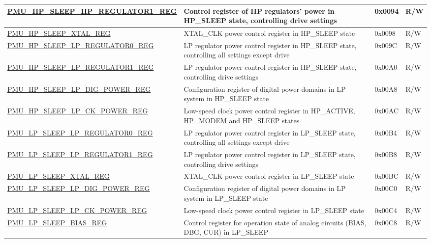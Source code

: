 \begin{longtable}{ | l | p{6cm} | p{1.3cm} | p{1.5cm} | }
\hyperref[regdesc:PMUHPSLEEPHPREGULATOR1REG]{PMU\_HP\_SLEEP\_HP\_REGULATOR1\_REG} & Control register of HP regulators' power in HP\_SLEEP state, controlling drive settings & 0x0094 & R/W \\ \hline
\hyperref[regdesc:PMUHPSLEEPXTALREG]{PMU\_HP\_SLEEP\_XTAL\_REG} & XTAL\_CLK power control register in HP\_SLEEP state & 0x0098 & R/W \\ \hline
\hyperref[regdesc:PMUHPSLEEPLPREGULATOR0REG]{PMU\_HP\_SLEEP\_LP\_REGULATOR0\_REG} & LP regulator power control register in HP\_SLEEP state, controlling all settings except drive & 0x009C & R/W \\ \hline
\hyperref[regdesc:PMUHPSLEEPLPREGULATOR1REG]{PMU\_HP\_SLEEP\_LP\_REGULATOR1\_REG} & LP regulator power control register in HP\_SLEEP state, controlling drive settings & 0x00A0 & R/W \\ \hline
\hyperref[regdesc:PMUHPSLEEPLPDIGPOWERREG]{PMU\_HP\_SLEEP\_LP\_DIG\_POWER\_REG} & Configuration register of digital power domains in LP system in HP\_SLEEP state & 0x00A8 & R/W \\ \hline
\hyperref[regdesc:PMUHPSLEEPLPCKPOWERREG]{PMU\_HP\_SLEEP\_LP\_CK\_POWER\_REG} & Low-speed clock power control register in HP\_ACTIVE, HP\_MODEM and HP\_SLEEP states & 0x00AC & R/W \\ \hline
\hyperref[regdesc:PMULPSLEEPLPREGULATOR0REG]{PMU\_LP\_SLEEP\_LP\_REGULATOR0\_REG} & LP regulator power control register in LP\_SLEEP state, controlling all settings except drive & 0x00B4 & R/W \\ \hline
\hyperref[regdesc:PMULPSLEEPLPREGULATOR1REG]{PMU\_LP\_SLEEP\_LP\_REGULATOR1\_REG} & LP regulator power control register in LP\_SLEEP state, controlling drive settings & 0x00B8 & R/W \\ \hline
\hyperref[regdesc:PMULPSLEEPXTALREG]{PMU\_LP\_SLEEP\_XTAL\_REG} & XTAL\_CLK power control register in LP\_SLEEP state & 0x00BC & R/W \\ \hline
\hyperref[regdesc:PMULPSLEEPLPDIGPOWERREG]{PMU\_LP\_SLEEP\_LP\_DIG\_POWER\_REG} & Configuration register of digital power domains in LP system in LP\_SLEEP state & 0x00C0 & R/W \\ \hline
\hyperref[regdesc:PMULPSLEEPLPCKPOWERREG]{PMU\_LP\_SLEEP\_LP\_CK\_POWER\_REG} & Low-speed clock power control register in LP\_SLEEP state & 0x00C4 & R/W \\ \hline
\hyperref[regdesc:PMULPSLEEPBIASREG]{PMU\_LP\_SLEEP\_BIAS\_REG} & Control register for operation state of analog circuits (BIAS, DBG, CUR) in LP\_SLEEP & 0x00C8 & R/W \\ \hline

\end{longtable}
